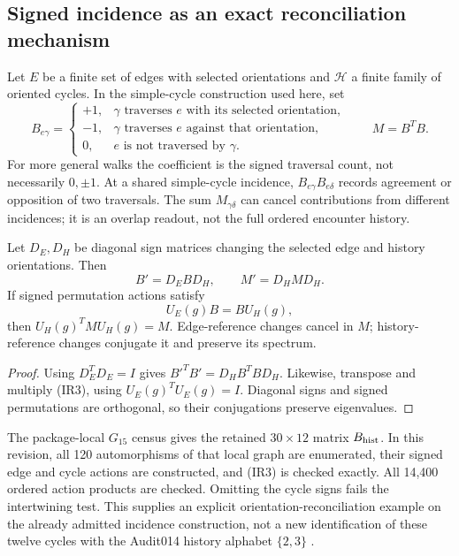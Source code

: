 \subsection*{Signed incidence as an exact reconciliation mechanism}
Let $E$ be a finite set of edges with selected orientations and $\mathcal H$ a finite family of oriented cycles. In the simple-cycle construction used here, set
\begin{equation}
B_{e\gamma}=\begin{cases}
+1,&\gamma\text{ traverses }e\text{ with its selected orientation},\\
-1,&\gamma\text{ traverses }e\text{ against that orientation},\\
0,&e\text{ is not traversed by }\gamma.
\end{cases}
\qquad M=B^TB.
\tag{IR1}\label{eq:signedincidencereconciliation}
\end{equation}
For more general walks the coefficient is the signed traversal count, not necessarily $0,\pm1$. At a shared simple-cycle incidence, $B_{e\gamma}B_{e\delta}$ records agreement or opposition of two traversals. The sum $M_{\gamma\delta}$ can cancel contributions from different incidences; it is an overlap readout, not the full ordered encounter history.

\begin{proposition}\label{prop:incidencecovariance}
Let $D_E,D_H$ be diagonal sign matrices changing the selected edge and history orientations. Then
\begin{equation}
B'=D_EBD_H,\qquad M'=D_HMD_H.
\tag{IR2}\label{eq:incidencegauge}
\end{equation}
If signed permutation actions satisfy
\begin{equation}
U_E(g)B=BU_H(g),
\tag{IR3}\label{eq:incidenceintertwiner}
\end{equation}
then $U_H(g)^TMU_H(g)=M$. Edge-reference changes cancel in $M$; history-reference changes conjugate it and preserve its spectrum.
\end{proposition}
\begin{proof}
Using $D_E^TD_E=I$ gives $B'^TB'=D_HB^TBD_H$. Likewise, transpose and multiply (IR3), using $U_E(g)^TU_E(g)=I$. Diagonal signs and signed permutations are orthogonal, so their conjugations preserve eigenvalues.
\end{proof}
The package-local $G_{15}$ census gives the retained $30\times12$ matrix $B_{\rm hist}$. In this revision, all 120 automorphisms of that local graph are enumerated, their signed edge and cycle actions are constructed, and (IR3) is checked exactly. All 14,400 ordered action products are checked. Omitting the cycle signs fails the intertwining test. This supplies an explicit orientation-reconciliation example on the already admitted incidence construction, not a new identification of these twelve cycles with the Audit014 history alphabet $\{2,3\}$ \citep{cave2026draft6replays}.

